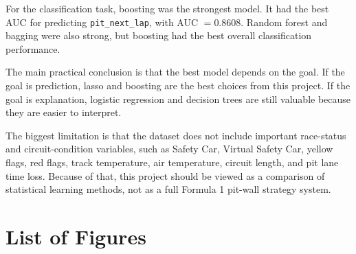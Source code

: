 \documentclass[11pt,oneside,openany]{book}
\begin{document}
For the classification task, boosting was the strongest model. It had the best AUC for predicting \texttt{pit\_next\_lap}, with AUC \(=0.8608\). Random forest and bagging were also strong, but boosting had the best overall classification performance.

The main practical conclusion is that the best model depends on the goal. If the goal is prediction, lasso and boosting are the best choices from this project. If the goal is explanation, logistic regression and decision trees are still valuable because they are easier to interpret.

The biggest limitation is that the dataset does not include important race-status and circuit-condition variables, such as Safety Car, Virtual Safety Car, yellow flags, red flags, track temperature, air temperature, circuit length, and pit lane time loss. Because of that, this project should be viewed as a comparison of statistical learning methods, not as a full Formula 1 pit-wall strategy system.

\tableofcontents

\clearpage
{}
\chapter*{List of Figures}
\end{document}
